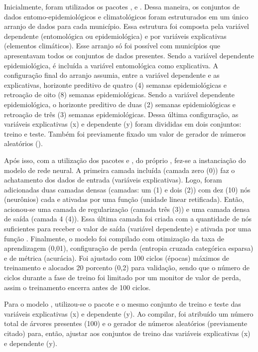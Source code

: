 \indent Inicialmente, foram utilizados os pacotes ,  e  \cite{scikit-learn_2011_pedregosa, sklearn_2013_buitinck}. Dessa maneira, os conjuntos de dados entomo-epidemiológicos e climatológicos foram estruturados em um único arranjo de dados para cada município. Essa estrutura foi composta pela variável dependente (entomológica ou epidemiológica) e por variáveis explicativas (elementos climáticos). Esse arranjo só foi possível com municípios que apresentavam todos os conjuntos de dados presentes. Sendo a variável dependente epidemiológica, é incluída a variável entomológica como explicativa. A configuração final do arranjo assumia, entre a variável dependente e as explicativas, horizonte preditivo de quatro (4) semanas epidemiológicas e retroação de oito (8) semanas epidemiológicas. Sendo a variável dependente epidemiológica, o horizonte preditivo de duas (2) semanas epidemiológicas e retroação de três (3) semanas epidemiológicas. Dessa última configuração, as variáveis explicativas (x) e dependente (y) foram divididas em dois conjuntos: treino e teste. Também foi previamente fixado um valor de gerador de números aleatórios ().

\indent Após isso, com a utilização dos pacotes \cite{tensorflow_2015_whitepaper} e  \cite{keras_2015_chollet}, do próprio , fez-se a instanciação do modelo de rede neural. A primeira camada incluída (camada zero (0)) faz o achatamento dos dados de entrada (variáveis explicativas). Logo, foram adicionadas duas camadas densas (camadas: um (1) e dois (2)) com dez (10) nós (neurônios) cada e ativadas por uma função  (unidade linear retificada). Então, acionou-se uma camada de regularização (camada três (3)) e uma camada densa de saída (camada 4 (4)). Essa última camada foi criada com a quantidade de nós suficientes para receber o valor de saída (variável dependente) e ativada por uma função . Finalmente, o modelo foi compilado com otimização da taxa de aprendizagem (0,01), configuração de perda (entropia cruzada categórica esparsa) e de métrica (acurácia). Foi ajustado com 100 ciclos (épocas) máximos de treinamento e alocados 20 porcento (0,2) para validação, sendo que o número de ciclos durante a fase de treino foi limitado por um monitor de valor de perda, assim o treinamento encerra antes de 100 ciclos.

\indent Para o modelo , utilizou-se o pacote  e o mesmo conjunto de treino e teste das variáveis explicativas (x) e dependente (y). Ao compilar, foi atribuído um número total de árvores presentes (100) e o gerador de números aleatórios (previamente citado) para, então, ajustar aos conjuntos de treino das variáveis explicativas (x) e dependente (y).

